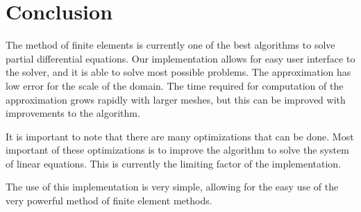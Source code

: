 \documentclass[10pt]{armath}
\numberwithin{equation}{section}
\theoremstyle{definition}
\begin{document}



\section{Conclusion}%
\label{sec:conclusion}

The method of finite elements is currently one of the best algorithms to solve
partial differential equations. Our implementation allows for easy user
interface to the solver, and it is able to solve most possible problems. The
approximation has low error for the scale of the domain. The time required for
computation of the approximation grows rapidly with larger meshes, but this
can be improved with improvements to the algorithm.

It is important to note that there are many optimizations that can be done.
Most important of these optimizations is to improve the algorithm to solve the
system of linear equations. This is currently the limiting factor of the
implementation.

The use of this implementation is very simple, allowing for the easy use of the
very powerful method of finite element methods.

\newpage
\nocite{*}



\newpage

\end{document}
